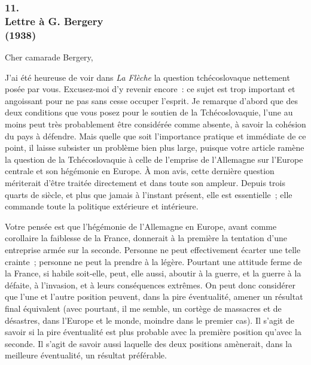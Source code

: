 \documentclass[french,twoside]{book} %
\begin{document}
\subsubsection[11. Lettre à G. Bergery, (1938)]{11. \\
Lettre à G. Bergery \\
(1938)}
\noindent \par
Cher camarade Bergery,\par
J'ai été heureuse de voir dans {\itshape La Flèche} la question tchécoslovaque nettement posée par vous. Excusez-moi d'y revenir encore : ce sujet est trop important et angoissant pour ne pas sans cesse occuper l'esprit. Je remarque d'abord que des deux conditions que vous posez pour le soutien de la Tchécoslovaquie, l'une au moins peut très probablement être considérée comme absente, à savoir la cohésion du pays à défendre. Mais quelle que soit l'importance pratique et immédiate de ce point, il laisse subsister un problème bien plus large, puisque votre article ramène la question de la Tchécoslo­vaquie à celle de l'emprise de l'Allemagne sur l'Europe centrale et son hégémonie en Europe. À mon avis, cette dernière question mériterait d'être traitée directement et dans toute son ampleur. Depuis trois quarts de siècle, et plus que jamais à l'instant présent, elle est essentielle ; elle commande toute la politique extérieure et intérieure.\par
Votre pensée est que l'hégémonie de l'Allemagne en Europe, avant comme corollaire la faiblesse de la France, donnerait à la première la tentation d'une entreprise armée sur la seconde. Personne ne peut effectivement écarter une telle crainte ; personne ne peut la prendre à la légère. Pourtant une attitude ferme de la France, si habile soit-elle, peut, elle aussi, aboutir à la guerre, et la guerre à la défaite, à l'invasion, et à leurs conséquences extrêmes. On peut donc considérer que l'une et l'autre position peuvent, dans la pire éventualité, amener un résultat final équivalent (avec pourtant, il me semble, un cortège de massacres et de désastres, dans l'Europe et le monde, moindre dans le premier cas). Il s'agit de savoir si la pire éventualité est plus probable avec la première position qu'avec la seconde. Il s'agit de savoir aussi laquelle des deux positions amènerait, dans la meilleure éventualité, un résultat préférable.\par
\end{document}
